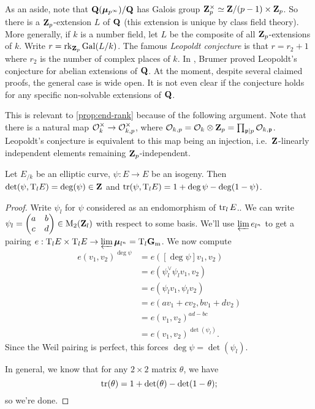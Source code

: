 As an aside, note that $\mathbf{Q}({\bm\mu}_{p^\infty})/\mathbf{Q}$ has Galois group 
$\mathbf{Z}_p^\times\simeq \mathbf{Z}/(p-1)\times \mathbf{Z}_p$. So there is a $\mathbf{Z}_p$-extension 
$L$ of $\mathbf{Q}$ (this extension is unique by class field theory). More generally, 
if $k$ is a number field, let $L$ be the composite of all $\mathbf{Z}_p$-extensions of 
$k$. Write $r=\operatorname{rk}_{\mathbf{Z}_p}\operatorname{Gal}(L/k)$. The famous \emph{Leopoldt conjecture} 
is that $r=r_2+1$ where $r_2$ is the number of complex places of $k$. In 
\cite{brumer-1967}, Brumer proved Leopoldt's conjecture for abelian extensions 
of $\mathbf{Q}$. At the moment, despite several claimed proofs, the general case is 
wide open. It is not even clear if the conjecture holds for any specific 
non-solvable extensions of $\mathbf{Q}$. 

This is relevant to \autoref{prop:end-rank} because of the following 
argument. Note that there is a natural map 
$\mathcal{O}_k^\times \to \mathcal{O}_{k,p}^\times$, where 
$\mathcal{O}_{k,p}=\mathcal{O}_k\otimes \mathbf{Z}_p=\prod_{\mathfrak{p}\mid p} \mathcal{O}_{k,\mathfrak{p}}$. Leopoldt's 
conjecture is equivalent to this map being an injection, i.e.~$\mathbf{Z}$-linearly 
independent elements remaining $\mathbf{Z}_p$-independent. 

\begin{proposition}
Let $E_{/k}$ be an elliptic curve, $\psi:E\to E$ be an isogeny. Then 
$\det(\psi,\mathrm{T}_l E) = \deg(\psi)\in \mathbf{Z}$ and 
$\operatorname{tr}(\psi,\mathrm{T}_l E) = 1+\deg\psi-\deg(1-\psi)$. 
\end{proposition}
\begin{proof}
Write $\psi_l$ for $\psi$ considered as an endomorphism of $\operatorname{tr}_l E$.. 
We can write 
$\psi_l=\begin{pmatrix} a & b \\ c & d \end{pmatrix}\in \operatorname{M}_2(\mathbf{Z}_l)$ 
with respect to some basis. We'll use $\varprojlim e_{l^n}$ to get a pairing 
$e:\mathrm{T}_l E\times \mathrm{T}_l E\to \varprojlim {\bm\mu}_{l^n} = \mathrm{T}_l \mathbf{G}_\mathrm{m}$. We now 
compute 
\begin{align*}
  e(v_1,v_2)^{\deg\psi} 
    &= e([\deg\psi]v_1,v_2) \\
    &= e(\psi_l^\vee\psi_l v_1,v_2) \\
    &= e(\psi_l v_1,\psi_l v_2) \\
    &= e(a v_1+c v_2, b v_1+d v_2) \\
    &= e(v_1,v_2)^{a d-b c} \\
    &= e(v_1,v_2)^{\det(\psi_l)} .
\end{align*}
Since the Weil pairing is perfect, this forces $\deg\psi=\det(\psi_l)$. 

In general, we know that for any $2\times 2$ matrix $\theta$, we have 
\begin{equation*}\label{eq:trace-id}
  \operatorname{tr}(\theta)=1+\det(\theta)-\det(1-\theta); 
\end{equation*}
so we're done. 
\end{proof}

